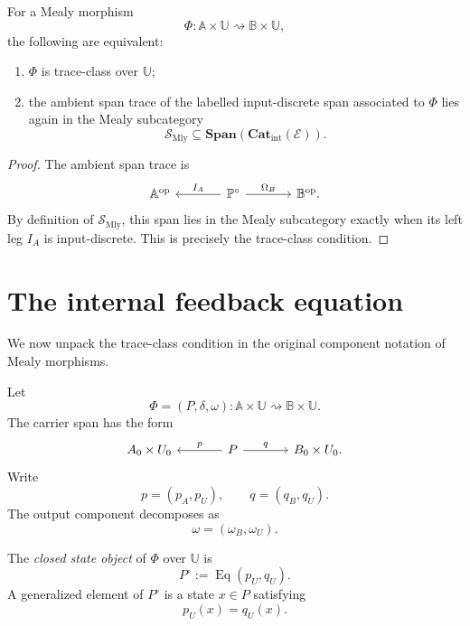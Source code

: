 \begin{proposition}
\label{prop:trace-class-ambient-closure}
For a Mealy morphism
\[
\Phi:
\mathbb A\times\mathbb U
\rightsquigarrow
\mathbb B\times\mathbb U,
\]
the following are equivalent:
\begin{enumerate}
\item \(\Phi\) is trace-class over \(\mathbb U\);
\item the ambient span trace of the labelled input-discrete span associated to
\(\Phi\) lies again in the Mealy subcategory
\[
\mathcal S_{\mathrm{Mly}}
\subseteq
\mathbf{Span}(\mathbf{Cat}_{\mathrm{int}}(\mathcal E)).
\]
\end{enumerate}
\end{proposition}

\begin{proof}
The ambient span trace is
\[
\begin{tikzcd}[column sep=large]
\mathbb A^{\mathrm{op}}
&
\mathbb P^\circ
  \arrow[l, "I_A"']
  \arrow[r, "\Omega_B"]
&
\mathbb B^{\mathrm{op}} .
\end{tikzcd}
\]
By definition of \(\mathcal S_{\mathrm{Mly}}\), this span lies in the Mealy
subcategory exactly when its left leg \(I_A\) is input-discrete.  This is
precisely the trace-class condition.
\end{proof}

\section{The internal feedback equation}
\label{sec:internal-feedback-equation}

We now unpack the trace-class condition in the original component notation of
Mealy morphisms.

Let
\[
\Phi=(P,\delta,\omega):
\mathbb A\times\mathbb U
\rightsquigarrow
\mathbb B\times\mathbb U.
\]
The carrier span has the form
\[
\begin{tikzcd}[column sep=large]
A_0\times U_0
&
P
  \arrow[l, "p"']
  \arrow[r, "q"]
&
B_0\times U_0 .
\end{tikzcd}
\]
Write
\[
p=(p_A,p_U),
\qquad
q=(q_B,q_U).
\]
The output component decomposes as
\[
\omega=(\omega_B,\omega_U).
\]

\begin{definition}
\label{def:closed-state-object}
The \emph{closed state object} of \(\Phi\) over \(\mathbb U\) is
\[
P^\circ:=\operatorname{Eq}(p_U,q_U).
\]
A generalized element of \(P^\circ\) is a state \(x\in P\) satisfying
\[
p_U(x)=q_U(x).
\]
\end{definition}

